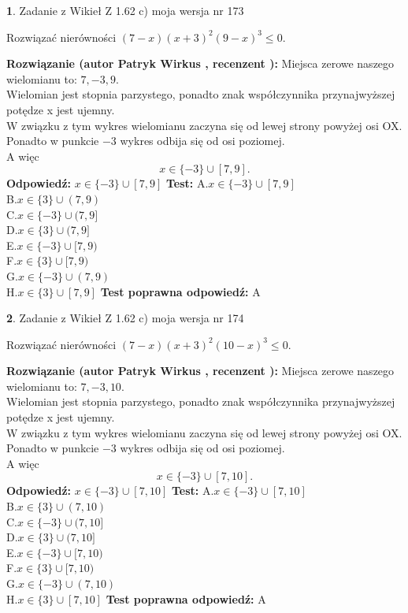 \documentclass[12pt, a4paper]{article}
\theoremstyle{definition} %
\newtheorem{zad}{}
\newcommand{\zadStart}[1]{\begin{zad}#1\newline}
\newcommand{\zadStop}{\end{zad}}
\newcommand{\rozwStart}[2]{\noindent \textbf{Rozwiązanie (autor #1 , recenzent #2): }\newline}
\newcommand{\rozwStop}{\newline}
\newcommand{\odpStart}{\noindent \textbf{Odpowiedź:}\newline}
\newcommand{\odpStop}{\newline}
\newcommand{\testStart}{\noindent \textbf{Test:}\newline}
\newcommand{\testStop}{\newline}
\newcommand{\kluczStart}{\noindent \textbf{Test poprawna odpowiedź:}\newline}
\newcommand{\kluczStop}{\newline}
\begin{document}
\zadStart{Zadanie z Wikieł Z 1.62 c) moja wersja nr 173}

Rozwiązać nierówności $(7-x)(x+3)^{2}(9-x)^{3}\le0$.
\zadStop
\rozwStart{Patryk Wirkus}{}
Miejsca zerowe naszego wielomianu to: $7, -3, 9$.\\
Wielomian jest stopnia parzystego, ponadto znak współczynnika przy\linebreak najwyższej potędze x jest ujemny.\\ W związku z tym wykres wielomianu zaczyna się od lewej strony powyżej osi OX.\\
Ponadto w punkcie $-3$ wykres odbija się od osi poziomej.\\
A więc $$x \in \{-3\} \cup [7,9].$$
\rozwStop
\odpStart
$x \in \{-3\} \cup [7,9]$
\odpStop
\testStart
A.$x \in \{-3\} \cup [7,9]$\\
B.$x \in \{3\} \cup (7,9)$\\
C.$x \in \{-3\} \cup (7,9]$\\
D.$x \in \{3\} \cup (7,9]$\\
E.$x \in \{-3\} \cup [7,9)$\\
F.$x \in \{3\} \cup [7,9)$\\
G.$x \in \{-3\} \cup (7,9)$\\
H.$x \in \{3\} \cup [7,9]$
\testStop
\kluczStart
A
\kluczStop



\zadStart{Zadanie z Wikieł Z 1.62 c) moja wersja nr 174}

Rozwiązać nierówności $(7-x)(x+3)^{2}(10-x)^{3}\le0$.
\zadStop
\rozwStart{Patryk Wirkus}{}
Miejsca zerowe naszego wielomianu to: $7, -3, 10$.\\
Wielomian jest stopnia parzystego, ponadto znak współczynnika przy\linebreak najwyższej potędze x jest ujemny.\\ W związku z tym wykres wielomianu zaczyna się od lewej strony powyżej osi OX.\\
Ponadto w punkcie $-3$ wykres odbija się od osi poziomej.\\
A więc $$x \in \{-3\} \cup [7,10].$$
\rozwStop
\odpStart
$x \in \{-3\} \cup [7,10]$
\odpStop
\testStart
A.$x \in \{-3\} \cup [7,10]$\\
B.$x \in \{3\} \cup (7,10)$\\
C.$x \in \{-3\} \cup (7,10]$\\
D.$x \in \{3\} \cup (7,10]$\\
E.$x \in \{-3\} \cup [7,10)$\\
F.$x \in \{3\} \cup [7,10)$\\
G.$x \in \{-3\} \cup (7,10)$\\
H.$x \in \{3\} \cup [7,10]$
\testStop
\kluczStart
A
\kluczStop
\end{document}
